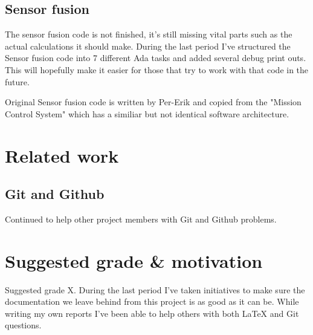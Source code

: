 \subsection{Sensor fusion}
The sensor fusion code is not finished, it's still missing vital parts such as
the actual calculations it should make. During the last period I've structured
the Sensor fusion code into 7 different Ada tasks and added several debug print
outs. This will hopefully make it easier for those that try to work with that
code in the future.

Original Sensor fusion code is written by Per-Erik and copied from the "Mission
Control System" which has a similiar but not identical software architecture.

\section{Related work}

\subsection{Git and Github}
Continued to help other project members with Git and Github problems.

\section{Suggested grade \& motivation}
Suggested grade X. During the last period I've taken initiatives to make sure
the documentation we leave behind from this project is as good as it can be.
While writing my own reports I've been able to help others with both LaTeX and
Git questions.
